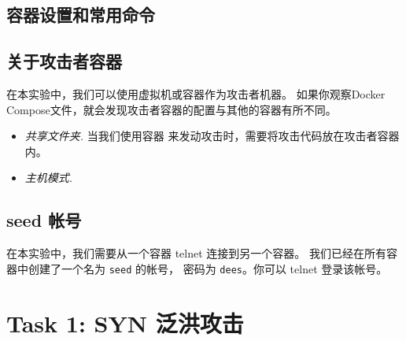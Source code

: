 \subsection{容器设置和常用命令}



 
\subsection{关于攻击者容器}

在本实验中，我们可以使用虚拟机或容器作为攻击者机器。
如果你观察Docker Compose文件，就会发现攻击者容器的配置与其他的容器有所不同。


\begin{itemize}
\item \textit{共享文件夹.} 当我们使用容器
来发动攻击时，需要将攻击代码放在攻击者容器内。



\item \textit{主机模式.}

\end{itemize}


%


\subsection{seed 帐号} 

在本实验中，我们需要从一个容器 telnet 连接到另一个容器。
我们已经在所有容器中创建了一个名为 \texttt{seed} 的帐号，
密码为 \texttt{dees}。你可以 telnet 登录该帐号。



\section{Task 1: SYN 泛洪攻击}


